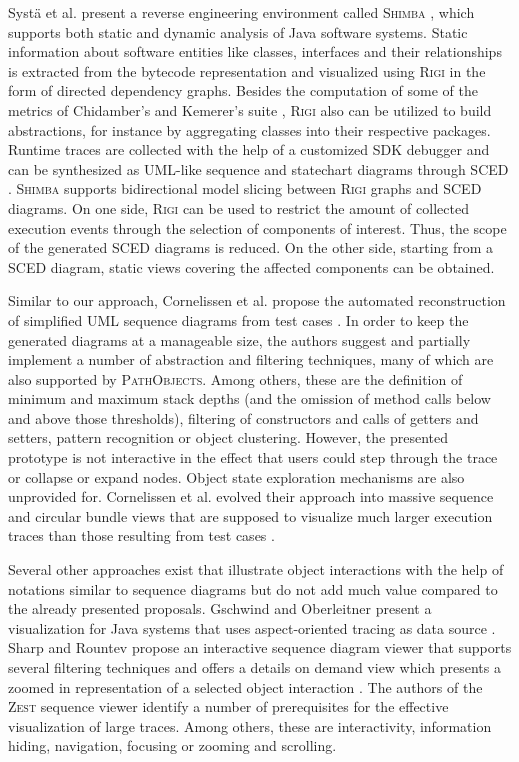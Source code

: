 Systä et al. present a reverse engineering environment called \textsc{Shimba} \cite{systa_shimba_2001}, which supports both static and dynamic analysis of Java software systems.
Static information about software entities like classes, interfaces and their relationships is extracted from the bytecode representation and visualized using \textsc{Rigi} \cite{muller_understanding_1993} in the form of directed dependency graphs.
Besides the computation of some of the metrics of Chidamber's and Kemerer's suite \cite{chidamber_metrics_1994}, \textsc{Rigi} also can be utilized to build abstractions, for instance by aggregating classes into their respective packages.
Runtime traces are collected with the help of a customized SDK debugger and can be synthesized as UML-like sequence and statechart diagrams through \textsc{SCED} \cite{koskimies_automated_1998,systa_understanding_2000}.
\textsc{Shimba} supports bidirectional model slicing between \textsc{Rigi} graphs and \textsc{SCED} diagrams.
On one side, \textsc{Rigi} can be used to restrict the amount of collected execution events through the selection of components of interest. Thus, the scope of the generated \textsc{SCED} diagrams is reduced.
On the other side, starting from a \textsc{SCED} diagram, static views covering the affected components can be obtained.

Similar to our approach, Cornelissen et al. propose the automated reconstruction of simplified UML sequence diagrams from test cases \cite{cornelissen_visualizing_2007}.
In order to keep the generated diagrams at a manageable size, the authors suggest and partially implement a number of abstraction and filtering techniques, many of which are also supported by \textsc{PathObjects}.
Among others, these are the definition of minimum and maximum stack depths (and the omission of method calls below and above those thresholds), filtering of constructors and calls of getters and setters, pattern recognition or object clustering.
However, the presented prototype is not interactive in the effect that users could step through the trace or collapse or expand nodes.
Object state exploration mechanisms are also unprovided for.
Cornelissen et al. evolved their approach into massive sequence and circular bundle views that are supposed to visualize much larger execution traces than those resulting from test cases \cite{cornelissen_understanding_2007, cornelissen_execution_2008}.

Several other approaches exist that illustrate object interactions with the help of notations similar to sequence diagrams but do not add much value compared to the already presented proposals.
Gschwind and Oberleitner present a visualization for Java systems that uses aspect-oriented tracing as data source \cite{gschwind_improving_2003}.
Sharp and Rountev propose an interactive sequence diagram viewer that supports several filtering techniques and offers a details on demand view which presents a zoomed in representation of a selected object interaction \cite{sharp_interactive_2005}.
The authors of the \textsc{Zest} sequence viewer \cite{bennett_working_2007} identify a number of prerequisites for the effective visualization of large traces. Among others, these are interactivity, information hiding, navigation, focusing or zooming and scrolling.

